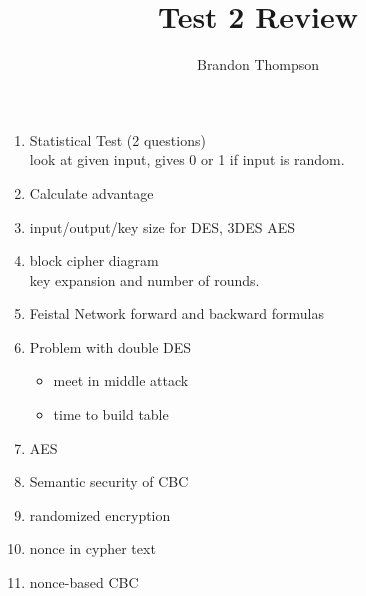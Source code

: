 \documentclass[a4paper]{article}
\begin{document}
	\title{Test 2 Review}
	\author{Brandon Thompson }
	\maketitle

	\begin{enumerate}
		\item Statistical Test (2 questions)\\
			look at given input, gives 0 or 1 if input is random.
		\item Calculate advantage
		\item input/output/key size for DES, 3DES AES
		\item block cipher diagram\\
			key expansion and number of rounds.
		\item Feistal Network forward and backward formulas
		\item Problem with double DES
			\begin{itemize}
				\item meet in middle attack
				\item time to build table
			\end{itemize}
		\item AES 
		\item Semantic security of CBC
		\item randomized encryption
		\item nonce in cypher text
		\item nonce-based CBC
	\end{enumerate}
\end{document}
